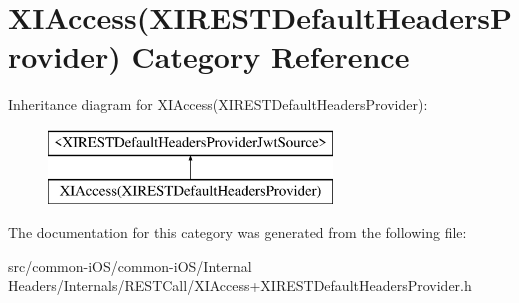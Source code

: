 \hypertarget{category_x_i_access_07_x_i_r_e_s_t_default_headers_provider_08}{}\section{X\+I\+Access(X\+I\+R\+E\+S\+T\+Default\+Headers\+Provider) Category Reference}
\label{category_x_i_access_07_x_i_r_e_s_t_default_headers_provider_08}
Inheritance diagram for X\+I\+Access(X\+I\+R\+E\+S\+T\+Default\+Headers\+Provider)\+:\begin{figure}[H]
\begin{center}
\leavevmode
\includegraphics[height=2.000000cm]{category_x_i_access_07_x_i_r_e_s_t_default_headers_provider_08}
\end{center}
\end{figure}


The documentation for this category was generated from the following file\+:\begin{DoxyCompactItemize}
\item 
src/common-\/i\+O\+S/common-\/i\+O\+S/\+Internal Headers/\+Internals/\+R\+E\+S\+T\+Call/X\+I\+Access+\+X\+I\+R\+E\+S\+T\+Default\+Headers\+Provider.\+h\end{DoxyCompactItemize}
